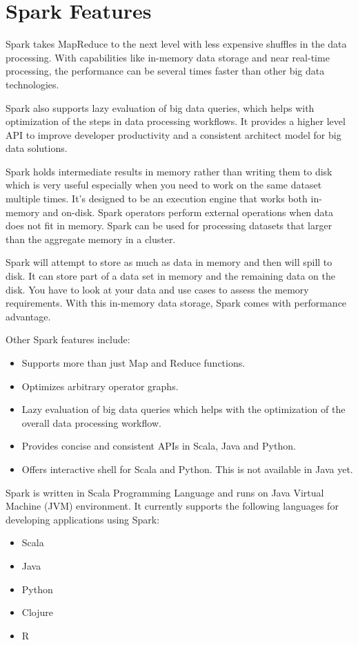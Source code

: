 \documentclass[a4paper,12pt]{article}
\begin{document}
\section*{Spark Features}

Spark takes MapReduce to the next level with less expensive shuffles in the data processing. With capabilities like in-memory data storage and near real-time processing, the performance can be several times faster than other big data technologies.

Spark also supports lazy evaluation of big data queries, which helps with optimization of the steps in data processing workflows. It provides a higher level API to improve developer productivity and a consistent architect model for big data solutions.

Spark holds intermediate results in memory rather than writing them to disk which is very useful especially when you need to work on the same dataset multiple times. It’s designed to be an execution engine that works both in-memory and on-disk. Spark operators perform external operations when data does not fit in memory. Spark can be used for processing datasets that larger than the aggregate memory in a cluster.

Spark will attempt to store as much as data in memory and then will spill to disk. It can store part of a data set in memory and the remaining data on the disk. You have to look at your data and use cases to assess the memory requirements. With this in-memory data storage, Spark comes with performance advantage.

Other Spark features include:
\begin{itemize}
\item  Supports more than just Map and Reduce functions.
\item  Optimizes arbitrary operator graphs.
\item  Lazy evaluation of big data queries which helps with the optimization of the overall data processing workflow.
\item  Provides concise and consistent APIs in Scala, Java and Python.
\item  Offers interactive shell for Scala and Python. This is not available in Java yet.
\end{itemize}


Spark is written in Scala Programming Language and runs on Java Virtual Machine (JVM) environment. It currently supports the following languages for developing applications using Spark:

\begin{itemize}
\item  Scala
\item Java
\item Python
\item Clojure
\item R
\end{itemize}
\end{document}
